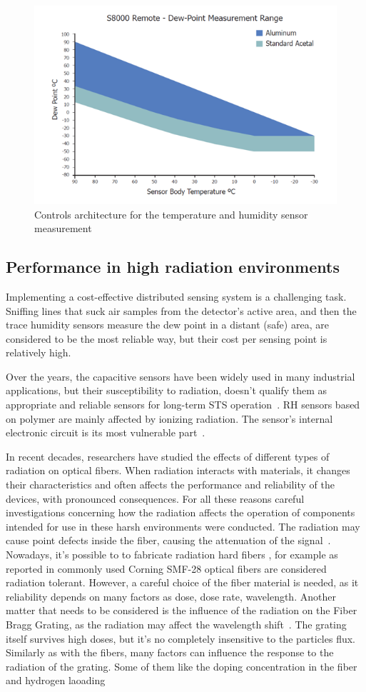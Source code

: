 \begin{figure}[!h]
\centering
\includegraphics[width=0.65\columnwidth]{Chapter5/images/s8000_remote.png}
\caption{Controls architecture for the temperature and humidity sensor measurement}
\label{fig:fos_mirror}
\end{figure}
\newpage
\subsection{Performance in high radiation environments}
Implementing a cost-effective distributed sensing system is a challenging task. Sniffing lines that suck air samples from the detector's active area, and then the trace humidity sensors measure the dew point in a distant (safe) area, are considered to be the most reliable way, but their cost per sensing point is relatively high. 

Over the years, the capacitive sensors have been widely used in many industrial applications, but their susceptibility to radiation, doesn't qualify them as appropriate and reliable sensors for long-term \gls{STS} operation~\cite{Kapic, capacitive_irrad, Berruti}.  RH sensors based on polymer are mainly affected by ionizing radiation. The sensor's internal electronic circuit is its most vulnerable part~\cite{SHCHEMEROV20222871}.

In recent decades, researchers have studied the effects of different types of radiation on optical fibers. When radiation interacts with materials, it changes their characteristics and often affects the performance and reliability of the devices, with pronounced consequences. For all these reasons careful investigations concerning how the radiation affects the operation of components intended for use in these harsh environments were conducted. The radiation may cause point defects inside the fiber, causing the attenuation of the signal~\cite{FOS_FIB_RAD}. Nowadays, it's possible to to fabricate radiation hard fibers \cite{troska}, for example as reported in \cite{Berruti} commonly used Corning SMF-28 optical fibers are considered radiation tolerant. However, a careful choice of the fiber material is needed, as it reliability depends on many factors as dose, dose rate, wavelength.  Another matter that needs to be considered is the influence of the radiation on the Fiber Bragg Grating, as the radiation may affect the wavelength shift~\cite{gusarov}. The grating itself survives high doses, but it's no completely insensitive to the particles flux. Similarly as with the fibers, many factors can influence the response to the radiation of the grating. Some of them like the doping concentration in the fiber and hydrogen laoading 



